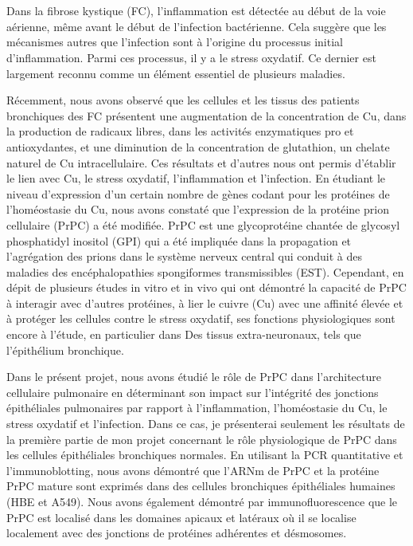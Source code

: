 %
\pdfbookmark[0]{\abstractname}{\abstractname}

\begingroup

\let\clearpage\relax
\let\cleardoublepage\relax
\let\cleardoublepage\relax

\chapter*{\abstractname}\label{sec:abstract}
\vspace*{-10mm}

Dans la fibrose kystique (FC), l'inflammation est détectée au début de la voie aérienne, même avant le début de l'infection bactérienne. Cela suggère que les mécanismes autres que l'infection sont à l'origine du processus initial d'inflammation. Parmi ces processus, il y a le stress oxydatif. Ce dernier est largement reconnu comme un élément essentiel de plusieurs maladies.

Récemment, nous avons observé que les cellules et les tissus des patients bronchiques des FC présentent une augmentation de la concentration de Cu, dans la production de radicaux libres, dans les activités enzymatiques pro et antioxydantes, et une diminution de la concentration de glutathion, un chelate naturel de Cu intracellulaire. Ces résultats et d'autres nous ont permis d'établir le lien avec Cu, le stress oxydatif, l'inflammation et l'infection.
En étudiant le niveau d'expression d'un certain nombre de gènes codant pour les protéines de l'homéostasie du Cu, nous avons constaté que l'expression de la protéine prion cellulaire (PrPC) a été modifiée. PrPC est une glycoprotéine chantée de glycosyl phosphatidyl inositol (GPI) qui a été impliquée dans la propagation et l'agrégation des prions dans le système nerveux central qui conduit à des maladies des encéphalopathies spongiformes transmissibles (EST).
Cependant, en dépit de plusieurs études in vitro et in vivo qui ont démontré la capacité de PrPC à interagir avec d'autres protéines, à lier le cuivre (Cu) avec une affinité élevée et à protéger les cellules contre le stress oxydatif, ses fonctions physiologiques sont encore à l'étude, en particulier dans Des tissus extra-neuronaux, tels que l'épithélium bronchique.

Dans le présent projet, nous avons étudié le rôle de PrPC dans l'architecture cellulaire pulmonaire en déterminant son impact sur l'intégrité des jonctions épithéliales pulmonaires par rapport à l'inflammation, l'homéostasie du Cu, le stress oxydatif et l'infection. Dans ce cas, je présenterai seulement les résultats de la première partie de mon projet concernant le rôle physiologique de PrPC dans les cellules épithéliales bronchiques normales. En utilisant la PCR quantitative et l'immunoblotting, nous avons démontré que l'ARNm de PrPC et la protéine PrPC mature sont exprimés dans des cellules bronchiques épithéliales humaines (HBE et A549). Nous avons également démontré par immunofluorescence que le PrPC est localisé dans les domaines apicaux et latéraux où il se localise localement avec des jonctions de protéines adhérentes et désmosomes.

